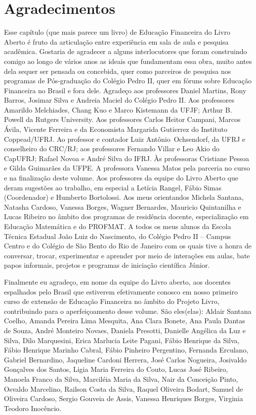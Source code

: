 \cleardoublepage
\def\currentcolor{cor1}
\thispagestyle{empty}

\section{Agradecimentos}

Esse capítulo (que mais parece um livro) de Educação Financeira do Livro Aberto é fruto da articulação entre experiência em sala de aula e pesquisa acadêmica. Gostaria de agradecer a alguns interlocutores que foram construindo comigo ao longo de vários anos as ideais que fundamentam essa obra, muito antes dela sequer ser pensada ou concebida, quer como parceiros de pesquisa nos programas de Pós-graduação do Colégio Pedro II, quer em fóruns sobre Educação Financeira no Brasil e fora dele. Agradeço aos professores Daniel Martins, Rony Barros, Josimar Silva e Andreia Maciel do Colégio Pedro II. Aos professores Amarildo Melchiades, Chang Kuo e Marco Kistemann da UFJF; Arthur B. Powell da Rutgers University. Aos professores Carlos Heitor Campani, Marcos Ávila, Vicente Ferreira e da Economista Margarida Gutierrez do Instituto Coppead/UFRJ. Ao professor e contador Luiz Antônio Ochsendorf, da UFRJ e conselheiro do CRC/RJ; aos professores Fernando Villar e Leo Akio do CapUFRJ; Rafael Novoa e André Silva do IFRJ. Às professoras Cristiane Pessoa e Gilda Guimarães da UFPE. A professora Vanessa Matos pela parceria no curso e na finalização deste
volume. Aos professores da equipe do Livro Aberto que deram sugestões ao trabalho, em especial a Letícia Rangel, Fábio Simas (Coordenador) e Humberto Bortolossi. Aos meus orientandos Michela Santana, Natasha Cardoso, Vanessa Borges, Wagner Bernardes, Mauricio Quintanilha e Lucas Ribeiro no âmbito dos programas de residência docente, especialização em Educação Matemática e do PROFMAT. A todos os meus alunos da Escola Técnica Estadual João Luiz do Nascimento, do Colégio Pedro II – Campus Centro e do Colégio de São Bento do Rio de Janeiro com os quais tive a honra de conversar, trocar, experimentar e aprender por meio de interações em aulas, bate papos informais, projetos e programas de iniciação científica Júnior. 

Finalmente eu agradeço, em nome da equipe do Livro aberto, aos docentes espalhados pelo Brasil que estiverem efetivamente conosco em nosso primeiro curso de extensão de Educação Financeira no âmbito do Projeto Livro, contribuindo para o aperfeiçoamento desse volume. São eles(elas): Aldair Santana Coelho, Amanda Pereira Lima Mesquita, Ana Clara Bonete, Ana
Paula Dantas de Souza, André Monteiro Novaes, Daniela Presotti, Danielle Angélica da Luz e Silva, Dilo Marquesini, Erica Marlucia Leite Pagani, Fábio Henrique da Silva, Fábio Henrique Marinho Cabral, Fábio Pinheiro Pergentino, Fernanda Erculano, Gabriel Bernardino, Jaqueline Cardoni Herrera, José Carlos Nogueira, Josivaldo Gonçalves dos Santos, Ligia Maria Ferreira do Couto, Lucas José Ribeiro, Manoela Franco da Silva, Marciléia Maria da Silva, Nair da Conceição Pinto, Osvaldo Marcelino, Railson Costa da Silva, Raquel Oliveira Bodart, Samuel de Oliveira Cardoso, Sergio Gouveia de Assis, Vanessa Henriques Borges, Virginia Teodoro Inocêncio.

